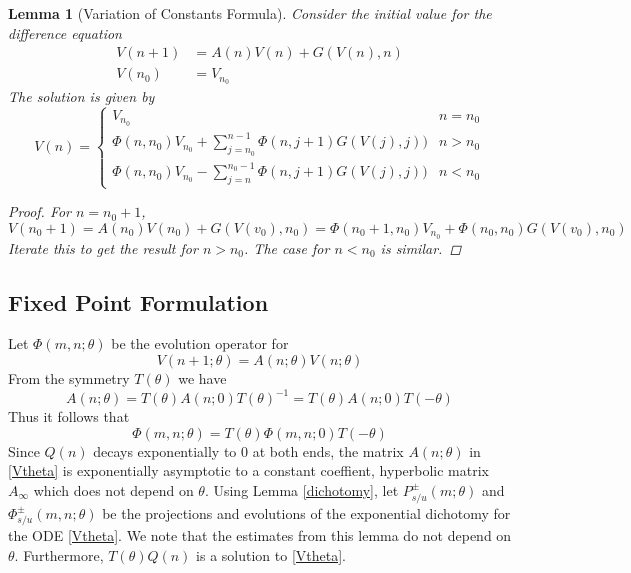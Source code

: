 \documentclass[12pt]{article}
\newtheorem{lemma}{Lemma}
\begin{document}
\begin{lemma}[Variation of Constants Formula]\label{VOC}
Consider the initial value for the difference equation
\begin{align*}
V(n+1) &= A(n) V(n) + G(V(n), n) \\
V(n_0) &= V_{n_0}
\end{align*}
The solution is given by
\begin{equation}\label{VOCformula}
V(n) = 
\begin{cases}
V_{n_0} & n = n_0 \\
\Phi(n, n_0) V_{n_0} + \sum_{j = n_0}^{n-1} \Phi(n, j+1) G(V(j), j)) & n > n_0 \\
\Phi(n, n_0) V_{n_0} - \sum_{j = n}^{n_0-1} \Phi(n, j+1) G(V(j), j)) & n < n_0 
\end{cases}
\end{equation}
\begin{proof}
For $n = n_0 + 1$,
\[
V(n_0 + 1) = A(n_0) V(n_0) + G(V(v_0), n_0) = \Phi(n_0+1, n_0) V_{n_0} + \Phi(n_0, n_0) G(V(v_0), n_0)
\]
Iterate this to get the result for $n > n_0$. The case for $n < n_0$ is similar.
\end{proof}
\end{lemma}

\subsection{Fixed Point Formulation}

Let $\Phi(m, n; \theta)$ be the evolution operator for 
\begin{equation}\label{Vtheta}
V(n+1; \theta) = A(n; \theta) V(n; \theta) 
\end{equation}
From the symmetry $T(\theta)$ we have
\[
A(n; \theta) = T(\theta)A(n; 0)T(\theta)^{-1} = T(\theta)A(n; 0)T(-\theta)
\]
Thus it follows that
\[
\Phi(m, n; \theta) = T(\theta)\Phi(m, n; 0)T(-\theta)
\]
Since $Q(n)$ decays exponentially to 0 at both ends, the matrix $A(n; \theta)$ in \eqref{Vtheta} is exponentially asymptotic to a constant coeffient, hyperbolic matrix $A_\infty$ which does not depend on $\theta$. Using Lemma \ref{dichotomy}, let $P_{s/u}^\pm(m; \theta)$ and $\Phi_{s/u}^\pm(m, n; \theta)$ be the projections and evolutions of the exponential dichotomy for the ODE \ref{Vtheta}. We note that the estimates from this lemma do not depend on $\theta$. Furthermore, $T(\theta)Q(n)$ is a solution to \eqref{Vtheta}.
\end{document}
